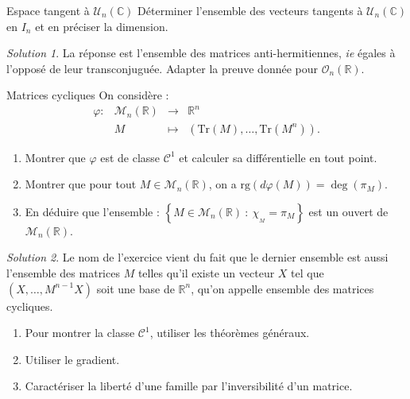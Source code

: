 \documentclass[french]{book}
\newcommand{\R}{\mathbb{R}}
\newcommand{\C}{\mathbb{C}}
\newcommand{\Tr}{\text{Tr}}
\theoremstyle{definition}
\theoremstyle{remark}
\newtheorem*{sol}{Solution}
\begin{document}
\begin{exo}[1]{Espace tangent à $\mathcal{U}_n(\C)$}
	Déterminer l'ensemble des vecteurs tangents à $\mathcal{U}_n(\C)$ en $I_n$ et en préciser la dimension.
\end{exo}
\begin{sol}
	La réponse est l'ensemble des matrices anti-hermitiennes, \textit{ie} égales à l'opposé de leur transconjuguée. Adapter la preuve donnée pour $\mathcal{O}_n(\R)$.
\end{sol}

\begin{exo}[2]{Matrices cycliques}
	On considère : $$\begin{array}{lrcl}
		\varphi:&\mathcal{M}_n(\R)&\longrightarrow&\R^n \\
		&M&\longmapsto&(\Tr(M),\ldots,\Tr(M^n)).
	\end{array}$$
	\begin{enumerate}
		\item Montrer que $\varphi$ est de classe $\mathcal{C}^1$ et calculer sa différentielle en tout point.
		\item Montrer que pour tout $M\in\mathcal{M}_n(\R)$, on a $\text{rg}(d\varphi(M))=\deg(\pi_M)$.
		\item En déduire que l'ensemble : $\left\{M\in\mathcal{M}_n(\R)\ : \ \chi_{_M}=\pi_M\right\}$ est un ouvert de $\mathcal{M}_n(\R)$.
	\end{enumerate}
\end{exo}
\begin{sol}
	Le nom de l'exercice vient du fait que le dernier ensemble est aussi l'ensemble des matrices $M$ telles qu'il existe un vecteur $X$ tel que $(X,\ldots,M^{n-1}X)$ soit une base de $\R^n$, qu'on appelle ensemble des matrices cycliques.
	\begin{enumerate}
		\item Pour montrer la classe $\mathcal{C}^1$, utiliser les théorèmes généraux.
		\item Utiliser le gradient.
		\item Caractériser la liberté d'une famille par l'inversibilité d'un matrice.
	\end{enumerate}
\end{sol}
\end{document}
